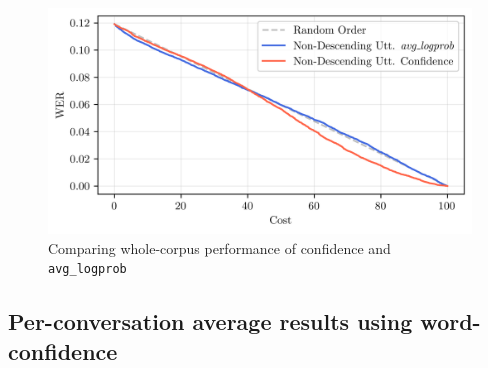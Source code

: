 \begin{figure}[p]
 \caption{Comparing whole-corpus performance of confidence and \texttt{avg\_logprob}}
 \label{fig:corpus-avg-lprob-uttconf}
 \includegraphics[width=\textwidth]{figures/corpus-avg-lprob-uttconf.png}
 \centering
\end{figure}

\clearpage
\subsection{Per-conversation average results using word-confidence}\label{subsec:avg-word-conf}

